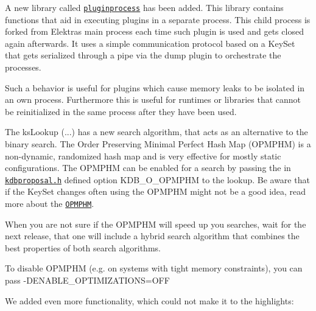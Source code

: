 A new library called \href{https://github.com/ElektraInitiative/libelektra/tree/master/src/libs/pluginprocess}{\tt pluginprocess} has been added. This library contains functions that aid in executing plugins in a separate process. This child process is forked from Elektra\textquotesingle{}s main process each time such plugin is used and gets closed again afterwards. It uses a simple communication protocol based on a Key\+Set that gets serialized through a pipe via the {\ttfamily dump} plugin to orchestrate the processes.

Such a behavior is useful for plugins which cause memory leaks to be isolated in an own process. Furthermore this is useful for runtimes or libraries that cannot be reinitialized in the same process after they have been used.

The {\ttfamily ks\+Lookup (...)} has a new search algorithm, that acts as an alternative to the binary search. The Order Preserving Minimal Perfect Hash Map (O\+P\+M\+P\+HM) is a non-\/dynamic, randomized hash map and is very effective for mostly static configurations. The O\+P\+M\+P\+HM can be enabled for a search by passing the in \href{https://github.com/ElektraInitiative/libelektra/blob/master/src/include/kdbproposal.h}{\tt kdbproposal.\+h} defined option {\ttfamily K\+D\+B\+\_\+\+O\+\_\+\+O\+P\+M\+P\+HM} to the lookup. Be aware that if the Key\+Set changes often using the O\+P\+M\+P\+HM might not be a good idea, read more about the \href{https://github.com/ElektraInitiative/libelektra/blob/master/doc/dev/data-structures.md#order-preserving-minimal-perfect-hash-map-aka-opmphm}{\tt O\+P\+M\+P\+HM}.

When you are not sure if the O\+P\+M\+P\+HM will speed up you searches, wait for the next release, that one will include a hybrid search algorithm that combines the best properties of both search algorithms.

To disable O\+P\+M\+P\+HM (e.\+g. on systems with tight memory constraints), you can pass {\ttfamily -\/\+D\+E\+N\+A\+B\+L\+E\+\_\+\+O\+P\+T\+I\+M\+I\+Z\+A\+T\+I\+O\+NS=O\+FF}

We added even more functionality, which could not make it to the highlights\+:


